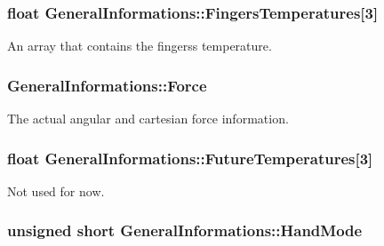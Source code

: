 \subsubsection[{\texorpdfstring{Fingers\+Temperatures}{FingersTemperatures}}]{\setlength{\rightskip}{0pt plus 5cm}float General\+Informations\+::\+Fingers\+Temperatures\mbox{[}3\mbox{]}}\hypertarget{struct_general_informations_a45e5897f59b7d00c5159a0a2e8d151d8}{}\label{struct_general_informations_a45e5897f59b7d00c5159a0a2e8d151d8}


An array that contains the fingers\textquotesingle{}s temperature. 

\subsubsection[{\texorpdfstring{Force}{Force}}]{ General\+Informations\+::\+Force}\hypertarget{struct_general_informations_a9f590b4fb00dc71b195348fbd18cc428}{}\label{struct_general_informations_a9f590b4fb00dc71b195348fbd18cc428}


The actual angular and cartesian force information. 

\subsubsection[{\texorpdfstring{Future\+Temperatures}{FutureTemperatures}}]{\setlength{\rightskip}{0pt plus 5cm}float General\+Informations\+::\+Future\+Temperatures\mbox{[}3\mbox{]}}\hypertarget{struct_general_informations_a9acf6d8134ee89b7de200ca863d46d94}{}\label{struct_general_informations_a9acf6d8134ee89b7de200ca863d46d94}


Not used for now. 

\subsubsection[{\texorpdfstring{Hand\+Mode}{HandMode}}]{\setlength{\rightskip}{0pt plus 5cm}unsigned short General\+Informations\+::\+Hand\+Mode}\hypertarget{struct_general_informations_a2fb3e86852c3ee8fedd27e745d71d7c7}{}\label{struct_general_informations_a2fb3e86852c3ee8fedd27e745d71d7c7}


